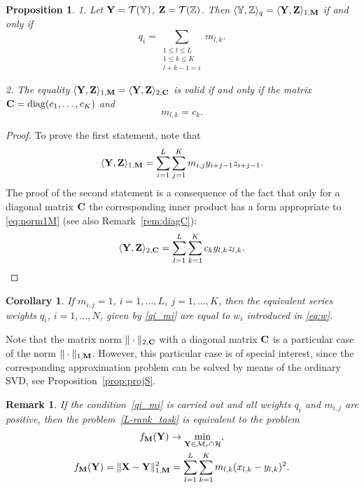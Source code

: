 \documentclass[sii]{ipart}
\newtheorem{corollary}{Corollary}
\newtheorem{proposition}{Proposition}
\newtheorem{remark}{Remark}
\begin{document}
\begin{proposition}
	\label{prop:equiv_tasks}
	1. Let $\mathbf{Y} = \mathcal{T}(\mathbb{Y})$,  $\mathbf{Z} = \mathcal{T}(\mathbb{Z})$. Then $\langle\mathbb{Y},\mathbb{Z}\rangle_q= \langle \mathbf{Y},\mathbf{Z} \rangle_{1,\mathbf{M}}$ if and only if
	\begin{equation}\label{qi_mi}
	q_i = \sum_{\substack{1 \le l \le L \\ 1 \le k \le K \\ l+k-1=i}} m_{l,k}.
	\end{equation}
	
	2. The equality $\langle\mathbf{Y},\mathbf{Z}\rangle_{1,\mathbf{M}}= \langle\mathbf{Y},\mathbf{Z}\rangle_{2,\mathbf{C}}$ is valid if and only if
the matrix $\mathbf{C}=\mathop{\mathrm{diag}}(c_1,\ldots,c_K)$ and
	\begin{equation}\label{sk_mlk}
	m_{l,k}=c_k.
	\end{equation}
\end{proposition}
\begin{proof}
	To prove the first statement, note that
	\begin{equation*}
	\langle \bfY, \bfZ \rangle_{1,\bfM} = \sum_{i = 1}^L \sum_{j = 1}^K m_{i,j} y_{i + j - 1} z_{i + j - 1}.
	\end{equation*}
The proof of the second statement is a consequence of the fact that only for a diagonal matrix $\mathbf{C}$ the corresponding inner product has a form appropriate to \eqref{eq:norm1M} (see also Remark~\ref{rem:diagC}):
	\begin{equation*}
	\langle \bfY, \bfZ \rangle_{2,\bfC} = \sum_{l=1}^L \sum_{k=1}^K c_k y_{l,k} z_{l, k}.
	\end{equation*}
\end{proof}

\begin{corollary}
	\label{cor:base_weights}
	If $m_{i,j}=1$, $i =1, \ldots, L$, $j = 1, \ldots, K$, then the equivalent series weights $q_i$, $i = 1, \ldots, N$, given by \eqref{qi_mi} are equal to $w_i$ introduced in \eqref{eq:w}.
\end{corollary}

Note that the matrix norm $\|\cdot\|_{2, \mathbf{C}}$ with a diagonal matrix $\mathbf{C}$ is a particular case of the norm $\|\cdot\|_{1, \mathbf{M}}$.
However, this particular case is of special interest, since the corresponding approximation problem can be solved by means of the ordinary SVD, see Proposition~\ref{prop:projS}.

\begin{remark}
	\label{rem:2tasks}
	If the condition~\eqref{qi_mi} is carried out and all weights $q_i$ and $m_{i,j}$ are positive, then the problem~\eqref{L-rank_task}
	is equivalent to the problem
	\begin{multline}
	\label{rank_task}
	f_\bfM(\bfY) \to \min_{\bfY \in \calM_r \cap \calH}, \\ f_\bfM(\bfY) = \|\bfX-\bfY\|^2_{1,\bfM} = \sum_{l = 1}^L \sum_{k=1}^K m_{l,k} (x_{l,k} - y_{l,k})^2.
	\end{multline}
\end{remark}
\end{document}
